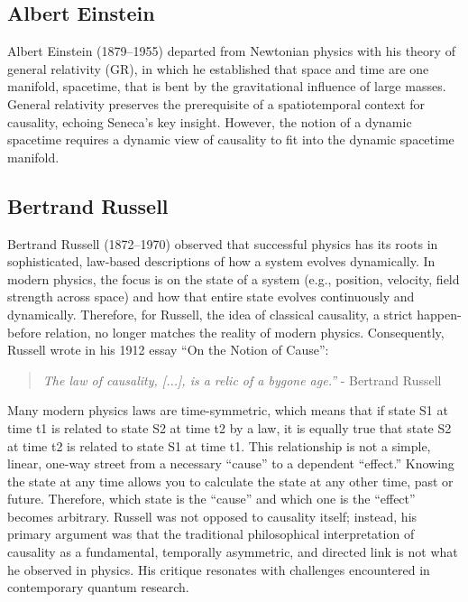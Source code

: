 \newpage


\subsection{Albert Einstein}
\label{sec:history_einstein}

Albert Einstein (1879--1955) departed from Newtonian physics with his theory of general relativity\cite{EinsteinPapers1915} (GR), in which he established that space and time are one manifold, spacetime, that is bent by the gravitational influence of large masses. General relativity preserves the prerequisite of a spatiotemporal context for causality, echoing Seneca's key insight. However, the notion of a dynamic spacetime requires a dynamic view of causality to fit into the dynamic spacetime manifold.

\subsection{Bertrand Russell}
\label{sec:history_Russell}

Bertrand Russell (1872--1970) observed that successful physics has its roots in sophisticated, law-based descriptions of how a system evolves dynamically. In modern physics, the focus is on the state of a system (e.g., position, velocity, field strength across space) and how that entire state evolves continuously and dynamically. Therefore, for Russell, the idea of classical causality, a strict happen-before relation, no longer matches the reality of modern physics. Consequently, Russell wrote in his 1912 essay ``On the Notion of Cause''\cite{RussellOnCause}:


\begin{quote}
    \begin{center}
            \textit{The law of causality, [...], is a relic of a bygone age.''} - Bertrand Russell
    \end{center}
\end{quote}


Many modern physics laws are time-symmetric, which means that if state S1 at time t1 is related to state S2 at time t2 by a law, it is equally true that state S2 at time t2 is related to state S1 at time t1. This relationship is not a simple, linear, one-way street from a necessary ``cause'' to a dependent ``effect.'' Knowing the state at any time allows you to calculate the state at any other time, past or future. Therefore, which state is the ``cause'' and which one is the ``effect'' becomes arbitrary. Russell was not opposed to causality itself; instead, his primary argument was that the traditional philosophical interpretation of causality as a fundamental, temporally asymmetric, and directed link is not what he observed in physics. His critique resonates with challenges encountered in contemporary quantum research.

